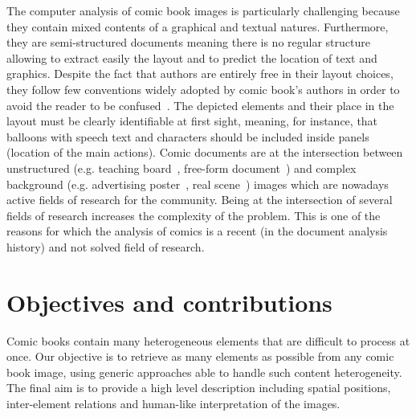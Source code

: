 The computer analysis of comic book images is particularly challenging because they contain mixed contents of a graphical and textual natures.
Furthermore, they are semi-structured documents meaning there is no regular structure allowing to extract easily the layout and to predict the location of text and graphics.
Despite the fact that authors are entirely free in their layout choices, they follow few conventions widely adopted by comic book's authors in order to avoid the reader to be confused~\cite{Laine2010,duc1997art}.
The depicted elements and their place in the layout must be clearly identifiable at first sight, meaning, for instance, that balloons with speech text and characters should be included inside panels (location of the main actions).
Comic documents are at the intersection between unstructured (e.g. teaching board~\cite{Oliveira10}, free-form document~\cite{Delaye2014Multi}) and complex background (e.g. advertising poster~\cite{Clavelli09}, real scene~\cite{Weinman09,Epshtein10,Neumann12}) images which are nowadays active fields of research for the community.
Being at the intersection of several fields of research increases the complexity of the problem.
This is one of the reasons for which the analysis of comics is a recent (in the document analysis history) and not solved field of research.



\section{Objectives and contributions}
\label{sec:intro:objectives_contributions}
Comic books contain many heterogeneous elements that are difficult to process at once.
Our objective is to retrieve as many elements as possible from any comic book image, using generic approaches able to handle such content heterogeneity.
The final aim is to provide a high level description including spatial positions, inter-element relations and human-like interpretation of the images.

